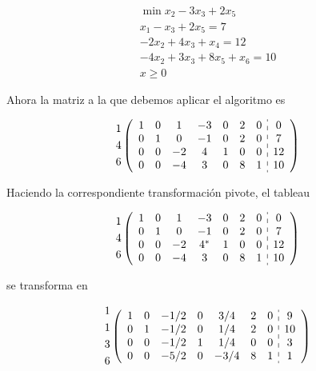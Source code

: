 \documentclass[10pt]{article}
\begin{document}
$$
\begin{gathered}
\min x_{2}-3 x_{3}+2 x_{5} \\
x_{1}-x_{3}+2 x_{5}=7 \\
-2 x_{2}+4 x_{3}+x_{4}=12 \\
-4 x_{2}+3 x_{3}+8 x_{5}+x_{6}=10 \\
x \geq 0
\end{gathered}
$$

Ahora la matriz a la que debemos aplicar el algoritmo es

$$
\begin{gathered}
1 \\
4 \\
6
\end{gathered}\left(\begin{array}{ccccccc:c}
1 & 0 & 1 & -3 & 0 & 2 & 0 & 0 \\
0 & 1 & 0 & -1 & 0 & 2 & 0 & 7 \\
0 & 0 & -2 & 4 & 1 & 0 & 0 & 12 \\
0 & 0 & -4 & 3 & 0 & 8 & 1 & 10
\end{array}\right)
$$

Haciendo la correspondiente transformación pivote, el tableau

$$
\begin{aligned}
& 1 \\
& 4 \\
& 6
\end{aligned}\left(\begin{array}{ccccccc:c}
1 & 0 & 1 & -3 & 0 & 2 & 0 & 0 \\
0 & 1 & 0 & -1 & 0 & 2 & 0 & 7 \\
0 & 0 & -2 & 4^{*} & 1 & 0 & 0 & 12 \\
0 & 0 & -4 & 3 & 0 & 8 & 1 & 10
\end{array}\right)
$$

se transforma en

$$
\begin{aligned}
& 1 \\
& 1 \\
& 3 \\
& 6
\end{aligned}\left(\begin{array}{ccccccc:c}
1 & 0 & -1 / 2 & 0 & 3 / 4 & 2 & 0 & 9 \\
0 & 1 & -1 / 2 & 0 & 1 / 4 & 2 & 0 & 10 \\
0 & 0 & -1 / 2 & 1 & 1 / 4 & 0 & 0 & 3 \\
0 & 0 & -5 / 2 & 0 & -3 / 4 & 8 & 1 & 1
\end{array}\right)
$$
\end{document}
